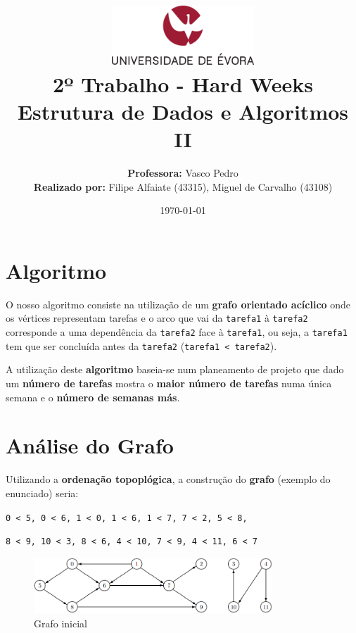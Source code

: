 \documentclass[11pt]{article}
\title
{
    \includegraphics[width=0.4\textwidth]{imgs/university.png}
    \\[0.1cm]
    \textbf{2º Trabalho - Hard Weeks} \\
    Estrutura de Dados e Algoritmos II
}
\author
{
    \textbf{Professora:} Vasco Pedro \\
    \textbf{Realizado por:} Filipe Alfaiate (43315), Miguel de Carvalho (43108) 
}
\date{\today}
\begin{document}
\maketitle

\section{Algoritmo}

\hspace{0,5cm}O nosso algoritmo consiste na utilização de um \textbf{grafo orientado acíclico}
onde os vértices representam tarefas e o arco que vai da \verb|tarefa1| à \verb|tarefa2| corresponde
a uma dependência da \verb|tarefa2| face à \verb|tarefa1|, ou seja, a \verb|tarefa1| tem que ser
concluída antes da \verb|tarefa2| (\verb|tarefa1 < tarefa2|).

A utilização deste \textbf{algoritmo} baseia-se num planeamento de projeto que dado um \textbf{número de
tarefas} mostra o \textbf{maior número de tarefas} numa única semana e o \textbf{número de semanas más}.

\section{Análise do Grafo}

\hspace{0,5cm}Utilizando a \textbf{ordenação topoplógica}, a construção do \textbf{grafo} (exemplo do enunciado)
seria:

\verb|0 < 5, 0 < 6, 1 < 0, 1 < 6, 1 < 7, 7 < 2, 5 < 8,|

\verb|8 < 9, 10 < 3, 8 < 6, 4 < 10, 7 < 9, 4 < 11, 6 < 7|

\begin{center}
    \begin{figure}[h!]
        \includegraphics[width=0.8\textwidth]{imgs/grafo.png}
        \caption{Grafo inicial}
        \label{fig:grafoIni}
    \end{figure}
\end{center}
\end{document}

